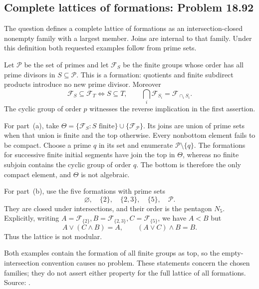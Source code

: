 \subsection{Complete lattices of formations: Problem 18.92}
\label{cand:18.92}

The question defines a complete lattice of formations as
an intersection-closed nonempty family with a largest
member. Joins are internal to that family. Under this
definition both requested examples follow from prime sets.

Let \(\mathcal P\) be the set of primes and let
\(\mathcal F_S\) be the finite groups whose order has
all prime divisors in \(S\subseteq\mathcal P\).
This is a formation: quotients and finite subdirect
products introduce no new prime divisor. Moreover
\[
 \mathcal F_S\subseteq\mathcal F_T\iff S\subseteq T,\qquad
 \bigcap_i\mathcal F_{S_i}=\mathcal F_{\cap_iS_i}.
\]
The cyclic group of order \(p\) witnesses the reverse
implication in the first assertion.

For part~(a), take
\(\Theta=\{\mathcal F_S:S\text{ finite}\}\cup
\{\mathcal F_{\mathcal P}\}\).
Its joins are union of prime sets when that union is
finite and the top otherwise. Every nonbottom element
fails to be compact. Choose a prime \(q\) in its set
and enumerate \(\mathcal P\setminus\{q\}\).
The formations for successive finite initial segments
have join the top in \(\Theta\), whereas no finite
subjoin contains the cyclic group of order \(q\).
The bottom is therefore the only compact element,
and \(\Theta\) is not algebraic.

For part~(b), use the five formations with prime sets
\[
 \varnothing,\quad\{2\},\quad\{2,3\},\quad\{5\},
 \quad\mathcal P.
\]
They are closed under intersections, and their order is
the pentagon \(N_5\). Explicitly, writing
\(A=\mathcal F_{\{2\}},B=\mathcal F_{\{2,3\}},
C=\mathcal F_{\{5\}}\), we have \(A<B\) but
\[
 A\vee(C\wedge B)=A,\qquad (A\vee C)\wedge B=B.
\]
Thus the lattice is not modular.

Both examples contain the formation of all finite groups
as top, so the empty-intersection convention causes no
problem. These statements concern the chosen families;
they do not assert either property for the full lattice
of all formations. Source:
.
